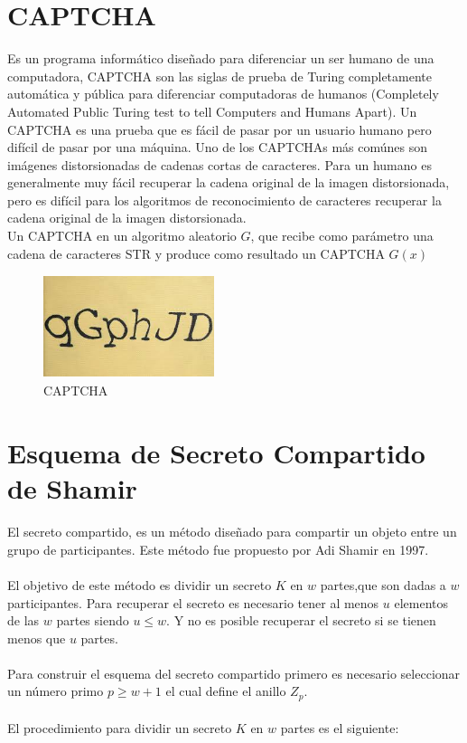 \documentclass[12pt,oneside,onecolumn,openany]{report}
\begin{document}
\section{CAPTCHA}
 Es un programa informático diseñado para diferenciar un ser humano de una computadora, CAPTCHA son las siglas de prueba de Turing completamente automática y pública para diferenciar computadoras de humanos (Completely Automated Public Turing test to tell Computers and Humans Apart).  Un CAPTCHA es una prueba que es fácil de pasar por un usuario humano pero difícil de pasar por una máquina. Uno de los CAPTCHAs más com\'unes son imágenes distorsionadas de cadenas cortas de caracteres. Para un humano es generalmente muy fácil recuperar la cadena original de la imagen distorsionada, pero es difícil para  los algoritmos de reconocimiento de caracteres recuperar la cadena original de la imagen distorsionada.\\
Un CAPTCHA en un algoritmo aleatorio $G$, que recibe como parámetro una cadena de caracteres STR y produce como resultado un CAPTCHA $G(x)$\\

\begin{figure}[H]
\centering
	\includegraphics[width=5cm, height=3cm]{./images/cptc.jpeg}
	\caption{CAPTCHA}
	\label{fig:3-6}
\end{figure}
 




\section{Esquema de Secreto Compartido de Shamir}
El secreto compartido, es un método dise\~nado para compartir un objeto entre un grupo de participantes. Este método fue propuesto por Adi Shamir en 1997.\cite{shamir}
\\
\\
El objetivo de este método es dividir un secreto $K$ en $w$ partes,que son dadas a $w$ participantes. Para recuperar el secreto es necesario tener al menos $u$
elementos de las $w$ partes siendo $u \leq w$. Y no es posible recuperar el secreto si se tienen menos que $u$ partes.
\\
\\
Para construir el esquema del secreto compartido primero es necesario seleccionar un número primo $p \geq w+1$ el cual define el anillo $Z_p$.
\\
\\
El procedimiento para dividir un secreto $K$ en $w$ partes es el siguiente:
\end{document}
